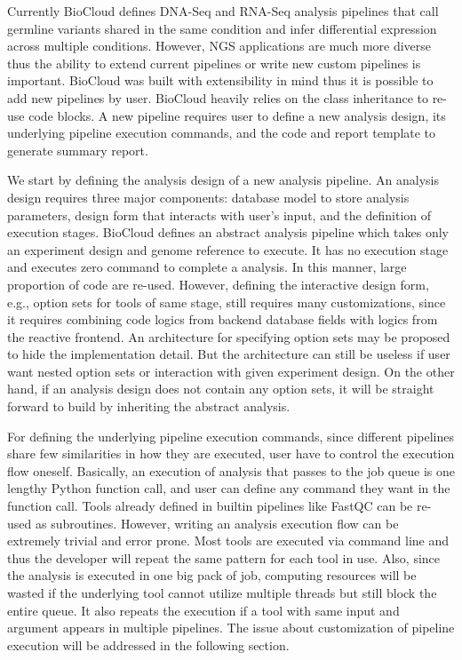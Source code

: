 Currently BioCloud defines DNA-Seq and RNA-Seq analysis pipelines that call
germline variants shared in the same condition and infer differential
expression across multiple conditions. However, NGS applications are much more
diverse thus the ability to extend current pipelines or write new custom
pipelines is important. BioCloud was built with extensibility in mind thus it
is possible to add new pipelines by user. BioCloud heavily relies on the class
inheritance to re-use code blocks. A new pipeline requires user to define a new
analysis design, its underlying pipeline execution commands, and the code and
report template to generate summary report.

We start by defining the analysis design of a new analysis pipeline. An
analysis design requires three major components: database model to store
analysis parameters, design form that interacts with user's input, and the
definition of execution stages. BioCloud defines an abstract analysis pipeline
which takes only an experiment design and genome reference to execute. It has
no execution stage and executes zero command to complete a analysis. In this
manner, large proportion of code are re-used. However, defining the interactive
design form, e.g., option sets for tools of same stage, still requires many
customizations, since it requires combining code logics from backend database
fields with logics from the reactive frontend. An architecture for specifying
option sets may be proposed to hide the implementation detail. But the
architecture can still be useless if user want nested option sets or
interaction with given experiment design. On the other hand, if an analysis
design does not contain any option sets, it will be straight forward to build
by inheriting the abstract analysis.

For defining the underlying pipeline execution commands, since different
pipelines share few similarities in how they are executed, user have to control
the execution flow oneself. Basically, an execution of analysis that passes to
the job queue is one lengthy Python function call, and user can define any
command they want in the function call. Tools already defined in builtin
pipelines like FastQC can be re-used as subroutines. However, writing an
analysis execution flow can be extremely trivial and error prone. Most tools
are executed via command line and thus the developer will repeat the same
pattern for each tool in use. Also, since the analysis is executed in one big
pack of job, computing resources will be wasted if the underlying tool cannot
utilize multiple threads but still block the entire queue. It also repeats the
execution if a tool with same input and argument appears in multiple pipelines.
The issue about customization of pipeline execution will be addressed in the
following section.

